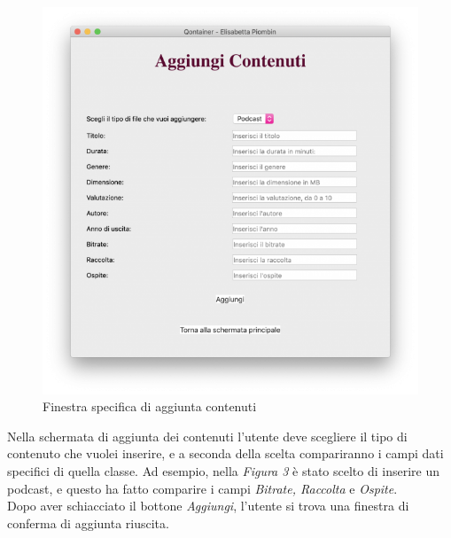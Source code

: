 \documentclass[a4paper,10pt]{article}
\begin{document}
\begin{figure}[H]
	\begin{center}
		\includegraphics[width=\textwidth,keepaspectratio]{immagini/AggiungiContenuti2.png}
	\end{center}
	\caption{\label{fig:my-label} Finestra specifica di aggiunta contenuti}
\end{figure}
Nella schermata di aggiunta dei contenuti l'utente deve scegliere il tipo di contenuto che vuolei inserire, e a seconda della scelta compariranno i campi dati specifici di quella classe. Ad esempio, nella \textit{Figura 3} è stato scelto di inserire un podcast, e questo ha fatto comparire i campi \textit{Bitrate, Raccolta} e \textit{Ospite}. \\
Dopo aver schiacciato il bottone \textit{Aggiungi}, l'utente si trova una finestra di conferma di aggiunta riuscita.
\end{document}
